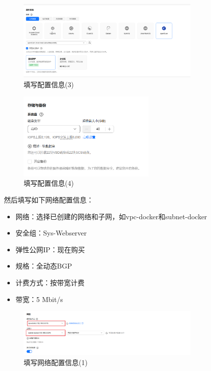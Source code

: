 \documentclass{article}
\begin{document}
\begin{figure}[H]
\centering
\includegraphics[width=0.8\textwidth]{img/1.4.3.png}
\caption{填写配置信息(3)}
\end{figure}

\begin{figure}[H]
\centering
\includegraphics[width=0.6\textwidth]{img/1.4.4.png}
\caption{填写配置信息(4)}
\end{figure}

然后填写如下网络配置信息：

\begin{itemize}[noitemsep]
    \item 网络：选择已创建的网络和子网，如vpc-docker和subnet-docker
    \item 安全组：Sys-Webserver
    \item 弹性公网IP：现在购买
    \item 规格：全动态BGP
    \item 计费方式：按带宽计费
    \item 带宽：5 Mbit/s
\end{itemize}

\begin{figure}[H]
\centering
\includegraphics[width=0.8\textwidth]{img/1.4.5.png}
\caption{填写网络配置信息(1)}
\end{figure}
\end{document}
